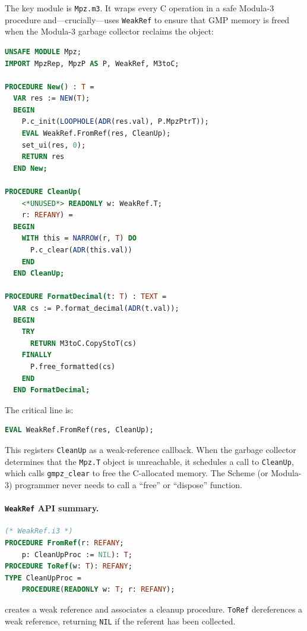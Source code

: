 \documentclass[12pt]{report}
\begin{document}
The key module is {\tt Mpz.m3}.  It wraps every C operation in a
safe Modula-3 procedure and---crucially---uses {\tt WeakRef} to
ensure that GMP memory is freed when the Modula-3 garbage collector
reclaims the object:

\begin{lstlisting}[language=Modula3]
UNSAFE MODULE Mpz;
IMPORT MpzRep, MpzP AS P, WeakRef, M3toC;

PROCEDURE New() : T =
  VAR res := NEW(T);
  BEGIN
    P.c_init(LOOPHOLE(ADR(res.val), P.MpzPtrT));
    EVAL WeakRef.FromRef(res, CleanUp);
    set_ui(res, 0);
    RETURN res
  END New;

PROCEDURE CleanUp(
    <*UNUSED*> READONLY w: WeakRef.T;
    r: REFANY) =
  BEGIN
    WITH this = NARROW(r, T) DO
      P.c_clear(ADR(this.val))
    END
  END CleanUp;

PROCEDURE FormatDecimal(t: T) : TEXT =
  VAR cs := P.format_decimal(ADR(t.val));
  BEGIN
    TRY
      RETURN M3toC.CopyStoT(cs)
    FINALLY
      P.free_formatted(cs)
    END
  END FormatDecimal;
\end{lstlisting}

\noindent The critical line is:
\begin{lstlisting}[language=Modula3]
EVAL WeakRef.FromRef(res, CleanUp);
\end{lstlisting}

\noindent This registers {\tt CleanUp} as a weak-reference callback.
When the garbage collector determines that the {\tt Mpz.T} object is
unreachable, it schedules a call to {\tt CleanUp}, which calls
{\tt gmpz\_clear} to free the C-allocated memory.  The Scheme (or
Modula-3) programmer never needs to call a ``free'' or ``dispose''
function.

\paragraph{{\tt WeakRef} API summary.}

\begin{lstlisting}[language=Modula3]
(* WeakRef.i3 *)
PROCEDURE FromRef(r: REFANY;
    p: CleanUpProc := NIL): T;
PROCEDURE ToRef(w: T): REFANY;
TYPE CleanUpProc =
    PROCEDURE(READONLY w: T; r: REFANY);
\end{lstlisting}

 creates a weak reference and associates
a cleanup procedure.  {\tt ToRef} dereferences a weak reference,
returning {\tt NIL} if the referent has been collected.
\end{document}
